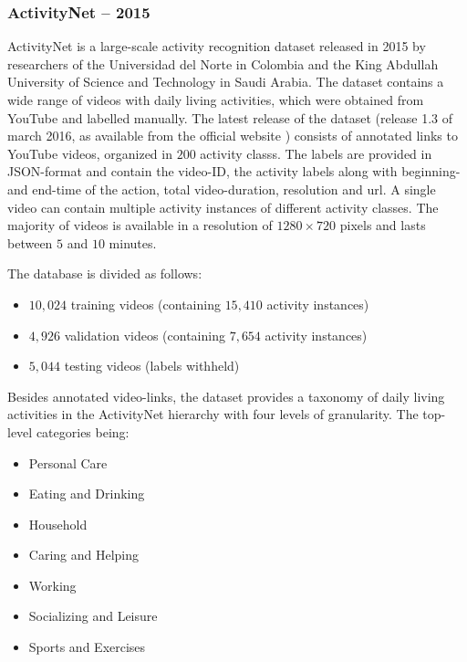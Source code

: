 \subsubsection{ActivityNet -- 2015}
ActivityNet \cite{caba_heilbron_activitynet:_2015} is a large-scale activity recognition dataset released in 2015 by researchers of the Universidad del Norte in Colombia and the King Abdullah University of Science and Technology in Saudi Arabia.
The dataset contains a wide range of videos with daily living activities, which were obtained from YouTube and labelled manually.
The latest release of the dataset (release 1.3 of march 2016, as available from the official website \cite{_activity_????}) consists of annotated links to YouTube videos, organized in $200$ activity classs.
The labels are provided in JSON-format and contain the video-ID, the activity labels along with beginning- and end-time of the action, total video-duration, resolution and url.
A single video can contain multiple activity instances of different activity classes.
The majority of videos is available in a resolution of $1280 \times 720$ pixels and lasts between $5$ and $10$ minutes.

The database is divided as follows:
\begin{itemize}
    \item $10,024$ training videos (containing $15,410$ activity instances) 
    \item $4,926$ validation videos (containing $7,654$ activity instances)
    \item $5,044$ testing videos (labels withheld) 
\end{itemize}

Besides annotated video-links, the dataset provides a taxonomy of daily living activities in the ActivityNet hierarchy with four levels of granularity.
The top-level categories being:
\begin{itemize}
    \item Personal Care
    \item Eating and Drinking
    \item Household
    \item Caring and Helping
    \item Working
    \item Socializing and Leisure
    \item Sports and Exercises
\end{itemize}

